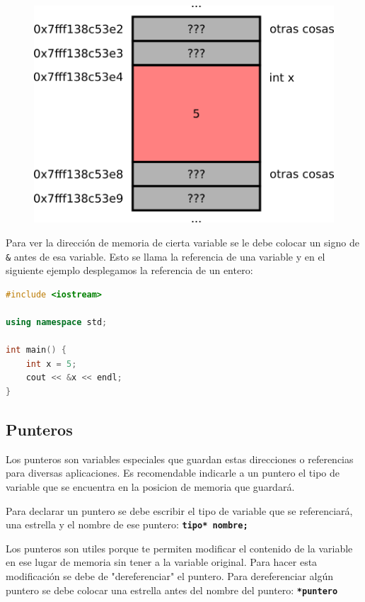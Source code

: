 \documentclass{article}
\begin{document}
\begin{figure}[H]
    \centering
    \includegraphics[width=0.4\paperwidth]{memoria}
\end{figure}

Para ver la dirección de memoria de cierta variable se le debe colocar un signo de \lstinline{&} antes de esa variable. Esto se llama la referencia de una variable y en el siguiente ejemplo desplegamos la referencia de un entero:

\begin{lstlisting}[language=C++, caption=Referencias]
#include <iostream>

using namespace std;

int main() {
	int x = 5;
	cout << &x << endl;
}
\end{lstlisting}

\subsection{Punteros}

Los punteros son variables especiales que guardan estas direcciones o referencias para diversas aplicaciones. Es recomendable indicarle a un puntero el tipo de variable que se encuentra en la posicion de memoria que guardará.

Para declarar un puntero se debe escribir el tipo de variable que se referenciará, una estrella y el nombre de ese puntero: \textbf{\lstinline{tipo* nombre;}}

Los punteros son utiles porque te permiten modificar el contenido de la variable en ese lugar de memoria sin tener a la variable original. Para hacer esta modificación se debe de "dereferenciar" el puntero. Para dereferenciar algún puntero se debe colocar una estrella antes del nombre del puntero: \textbf{\lstinline{*puntero}}
\end{document}
